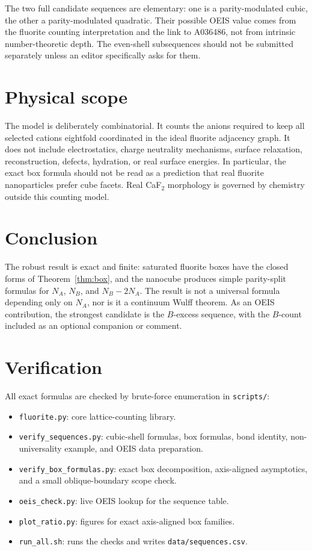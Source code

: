 \documentclass[11pt]{article}
\theoremstyle{plain}
\theoremstyle{definition}
\theoremstyle{remark}
\newcommand{\NA}{N_{\!A}}
\newcommand{\NB}{N_{\!B}}
\begin{document}
The two full candidate sequences are elementary: one is a parity-modulated
cubic, the other a parity-modulated quadratic.  Their possible OEIS value comes
from the fluorite counting interpretation and the link to A036486, not from
intrinsic number-theoretic depth.  The even-shell subsequences should not be
submitted separately unless an editor specifically asks for them.

\section{Physical scope}

The model is deliberately combinatorial.  It counts the anions required to keep
all selected cations eightfold coordinated in the ideal fluorite adjacency graph.
It does not include electrostatics, charge neutrality mechanisms, surface
relaxation, reconstruction, defects, hydration, or real surface energies.  In
particular, the exact box formula should not be read as a prediction that real
fluorite nanoparticles prefer cube facets.  Real CaF$_2$ morphology is governed
by chemistry outside this counting model.

\section{Conclusion}

The robust result is exact and finite: saturated fluorite boxes have the closed
forms of Theorem~\ref{thm:box}, and the nanocube produces simple parity-split
formulas for $\NA$, $\NB$, and $\NB-2\NA$.  The result is not a universal
formula depending only on $\NA$, nor is it a continuum Wulff theorem.  As an
OEIS contribution, the strongest candidate is the $B$-excess sequence, with the
$B$-count included as an optional companion or comment.

\appendix

\section{Verification}

All exact formulas are checked by brute-force enumeration in \texttt{scripts/}:
\begin{itemize}[leftmargin=2em,itemsep=2pt]
\item \texttt{fluorite.py}: core lattice-counting library.
\item \texttt{verify\_sequences.py}: cubic-shell formulas, box formulas,
  bond identity, non-universality example, and OEIS data preparation.
\item \texttt{verify\_box\_formulas.py}: exact box decomposition,
  axis-aligned asymptotics, and a small oblique-boundary scope check.
\item \texttt{oeis\_check.py}: live OEIS lookup for the sequence table.
\item \texttt{plot\_ratio.py}: figures for exact axis-aligned box families.
\item \texttt{run\_all.sh}: runs the checks and writes \texttt{data/sequences.csv}.
\end{itemize}
\end{document}
